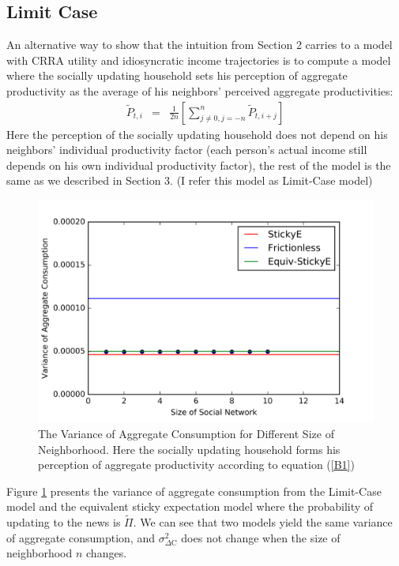 \documentclass[12pt,letterpaper]{article}
\begin{document}
\subsection{Limit Case}
An alternative way to show that the intuition from Section 2 carries to a model with CRRA utility and idiosyncratic income trajectories is to compute a model where the socially updating household sets his perception of aggregate productivity as the average of his neighbors' perceived aggregate productivities:
\begin{eqnarray} \label{B1}
\tilde{P}_{t,i}& = & \frac{1}{2n}\left[\sum_{j\neq0,j=-n}^{n}\tilde{P}_{t,i+j}\right]
\end{eqnarray}
Here the perception of the socially updating household does not depend on his neighbors' individual productivity factor (each person's actual income still depends on his own individual productivity factor), the rest of the model is the same as we described in Section 3. (I refer this model as Limit-Case model)
\begin{figure}[h]
	\includegraphics[scale=0.7]{Pcvd_Agg.png}
	\centering
	\caption{The Variance of Aggregate Consumption for Different Size of Neighborhood. Here the socially updating household forms his perception of aggregate productivity according to equation (\ref{B1})}
	\label{figure:AggEquiv}
\end{figure}
\par
Figure \ref{figure:AggEquiv} presents the variance of aggregate consumption from the Limit-Case model and the equivalent sticky expectation model where the probability of updating to the news is $\tilde{\Pi}$. We can see that two models yield the same variance of aggregate consumption, and $\sigma^{2}_{\Delta\mathrm{C}}$ does not change when the size of neighborhood $n$ changes.  
\end{document}
